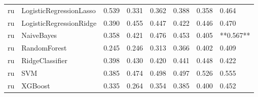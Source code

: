 \begin{tabular}{llllllll}
      ru &      LogisticRegressionLasso & 0.539 &                     0.331 &                 0.362 &                  0.388 &                                   0.358 &     0.464 \\
      ru &      LogisticRegressionRidge & 0.390 &                     0.455 &                 0.447 &                  0.422 &                                   0.446 &     0.470 \\
      ru &                   NaiveBayes & 0.358 &                     0.421 &                 0.476 &                  0.453 &                                   0.405 & **0.567** \\
      ru &                 RandomForest & 0.245 &                     0.246 &                 0.313 &                  0.366 &                                   0.402 &     0.409 \\
      ru &              RidgeClassifier & 0.398 &                     0.430 &                 0.420 &                  0.441 &                                   0.448 &     0.422 \\
      ru &                          SVM & 0.385 &                     0.474 &                 0.498 &                  0.497 &                                   0.526 &     0.555 \\
      ru &                      XGBoost & 0.335 &                     0.264 &                 0.354 &                  0.385 &                                   0.400 &     0.452 \\
\bottomrule
\end{tabular}
